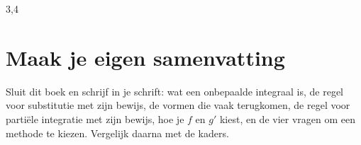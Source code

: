 \begin{oefeningen}
\begin{alleenvoor}{3,4}
\end{alleenvoor}



\end{oefeningen}


\begin{oefeningen}






\end{oefeningen}


\ifzelfstudie
\section*{Maak je eigen samenvatting}
Sluit dit boek en schrijf in je schrift: wat een onbepaalde integraal is, de regel voor substitutie met zijn bewijs, de vormen die vaak terugkomen, de regel voor partiële integratie met zijn bewijs, hoe je $f$ en $g'$ kiest, en de vier vragen om een methode te kiezen. Vergelijk daarna met de kaders.
\fi
